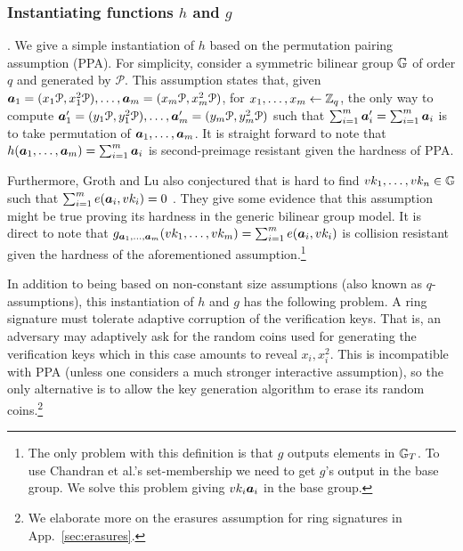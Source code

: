 
\subsubsection{Instantiating functions $h$ and $g$}. We give a simple instantiation of $h$ based on the permutation pairing assumption (PPA). For simplicity, consider a symmetric bilinear group $\mathbb{G}$ of order $q$ and generated by $\mathcal{P}$. This assumption states that, given ${\boldsymbol{a}}_1 = (x_1\mathcal{P},x_1^2\mathcal{P}),\ldots,{\boldsymbol{a}}_m=(x_m\mathcal{P},x^2_m\mathcal{P})$, for $x_1,\ldots,x_m\gets\mathbb{Z}_q$, the only way to compute ${\boldsymbol{a}}'_1=(y_1\mathcal{P},y_1^2\mathcal{P}),\ldots,{\boldsymbol{a}}'_m=(y_m\mathcal{P},y_m^2\mathcal{P})$ such that $\sum_{i=1}^m {\boldsymbol{a}}'_i = \sum_{i=1}^m{\boldsymbol{a}}_i$ is to take permutation of ${\boldsymbol{a}}_1,\ldots,{\boldsymbol{a}}_m$.  It is straight forward to note that $h({\boldsymbol{a}}_1,\ldots,{\boldsymbol{a}}_m) = \sum_{i=1}^m {\boldsymbol{a}}_i$ is second-preimage resistant given the hardness of PPA.

Furthermore, Groth and Lu also conjectured that is hard to find $vk_1,\ldots,vk_n\in\mathbb{G}$ such that $\sum_{i=1}^m e({\boldsymbol{a}}_i,vk_i)=0$ \cite{AC:GroLu07}. They give some evidence that this assumption might be true proving its hardness in the generic bilinear group model. It is direct to note that $g_{{\boldsymbol{a}}_1,\ldots,{\boldsymbol{a}}_m}(vk_1,\ldots,vk_m) = \sum_{i=1}^m e({\boldsymbol{a}}_i,vk_i)$ is collision resistant given the hardness of the aforementioned assumption.\footnote{The only problem with this definition is that $g$ outputs elements in $\mathbb{G}_T$. To use Chandran et al.'s set-membership we need to get $g$'s output  in the base group. We solve this problem giving $vk_i{\boldsymbol{a}}_i$ in the base group.}

In addition to being based on non-constant size assumptions (also known as $q$-assumptions), this instantiation of $h$ and $g$ has the following problem. A ring signature must tolerate adaptive corruption of the verification keys. That is, an adversary may adaptively ask for the random coins used for generating the verification keys which in this case amounts to reveal $x_i,x_i^2$. This is incompatible with PPA (unless one considers a much stronger interactive assumption), so the only alternative is to allow the key generation algorithm to erase its random coins.\footnote{We elaborate more on the erasures assumption for ring signatures in App.~\ref{sec:erasures}.}

